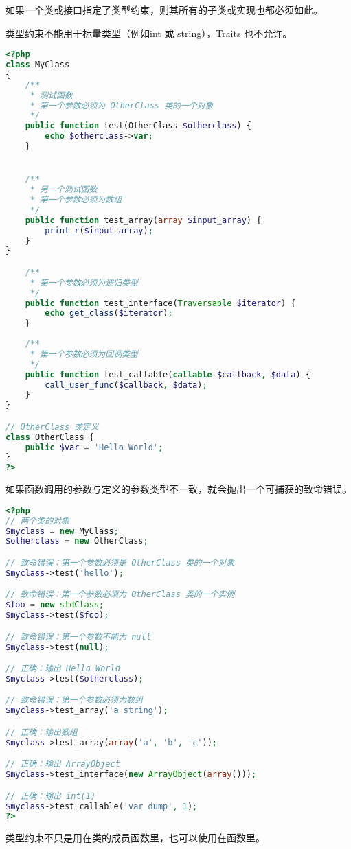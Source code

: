 如果一个类或接口指定了类型约束，则其所有的子类或实现也都必须如此。

类型约束不能用于标量类型（例如int 或 string），Traits 也不允许。



\begin{lstlisting}[language=PHP]
<?php
class MyClass
{
    /**
     * 测试函数
     * 第一个参数必须为 OtherClass 类的一个对象
     */
    public function test(OtherClass $otherclass) {
        echo $otherclass->var;
    }


    /**
     * 另一个测试函数
     * 第一个参数必须为数组 
     */
    public function test_array(array $input_array) {
        print_r($input_array);
    }
}

    /**
     * 第一个参数必须为递归类型
     */
    public function test_interface(Traversable $iterator) {
        echo get_class($iterator);
    }
    
    /**
     * 第一个参数必须为回调类型
     */
    public function test_callable(callable $callback, $data) {
        call_user_func($callback, $data);
    }
}

// OtherClass 类定义
class OtherClass {
    public $var = 'Hello World';
}
?>
\end{lstlisting}

如果函数调用的参数与定义的参数类型不一致，就会抛出一个可捕获的致命错误。

\begin{lstlisting}[language=PHP]
<?php
// 两个类的对象
$myclass = new MyClass;
$otherclass = new OtherClass;

// 致命错误：第一个参数必须是 OtherClass 类的一个对象
$myclass->test('hello');

// 致命错误：第一个参数必须为 OtherClass 类的一个实例
$foo = new stdClass;
$myclass->test($foo);

// 致命错误：第一个参数不能为 null
$myclass->test(null);

// 正确：输出 Hello World 
$myclass->test($otherclass);

// 致命错误：第一个参数必须为数组
$myclass->test_array('a string');

// 正确：输出数组
$myclass->test_array(array('a', 'b', 'c'));

// 正确：输出 ArrayObject
$myclass->test_interface(new ArrayObject(array()));

// 正确：输出 int(1)
$myclass->test_callable('var_dump', 1);
?>
\end{lstlisting}

类型约束不只是用在类的成员函数里，也可以使用在函数里。


